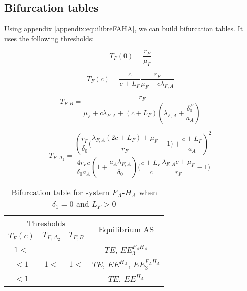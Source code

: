 \documentclass{article}
\newcommand{\lfa}{\lambda_{F, A}}
\newcommand{\df}{\delta_0^F}
\begin{document}
\begin{itemize}

\end{itemize}

\subsection{Bifurcation tables}
Using appendix \ref{appendix:equilibreFAHA}, we can build bifurcation tables. It uses the following thresholds:

$$
T_F(0) = \dfrac{r_F}{\mu_F}
$$

$$
T_F(c) = \dfrac{c}{c + L_F}\dfrac{r_F}{\mu_F + c \lfa}
$$

$$
T_{F, B} = \dfrac{r_F}{\mu_F + c\lfa + (c+L_F)(\lfa + \dfrac{\df}{a_A})}
$$

$$
T_{F,\Delta_2} = \dfrac{\left(\dfrac{r_F}{\delta_0}\Big(\dfrac{\lfa(2c+L_F) + \mu_F}{r_F} - 1\Big) + \dfrac{c+ L_F}{a_A}  \right)^ 2}{\dfrac{4 r_Fc}{\delta_0 a_A}\left(1 + \dfrac{a_A \lfa}{\delta_0}\right) \Big(\dfrac{c+L_F}{c} \dfrac{\lfa c + \mu_F}{r_F} - 1\Big)}	
$$
\begin{table}[!ht]
\centering
\caption{Bifurcation table for system $F_A$-$H_A$ when $\delta_1 = 0$ and $L_F > 0$}
\label{modelFAHA:bifurcation table, delta1=0}
\begin{tabular}{c|c|c|c}
\multicolumn{3}{c|}{Thresholds} & \multirow{2}{*}{Equilibrium AS}\\
$T_F(c)$ & $T_{F,\Delta_2}$ & $T_{F, B}$ &\\
 \hline
$1<$ & & & $TE$, $EE^{F_AH_A}_3$\\
\hline
$ <1$ & $1<$ & $1<$ &$TE$, $EE^{H_A}$, $EE^{F_AH_A}_3$ \\
\hline
$ <1$ & & &$TE$, $EE^{H_A}$
\end{tabular}
\end{table}
%
\end{document}
